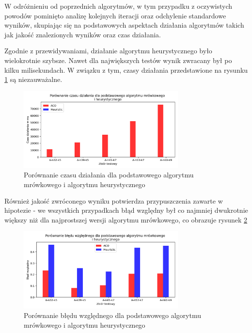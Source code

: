 \documentclass[10pt]{article}
\begin{document}
W odróżnieniu od poprzednich algorytmów, w tym przypadku z oczywistych powodów pominięto analizę kolejnych iteracji oraz odchylenie standardowe wyników, skupiając się na podstawowych aspektach działania algorytmów takich jak jakość znalezionych wyników oraz czas działania.

Zgodnie z przewidywaniami, działanie algorytmu heurystycznego było wielokrotnie szybsze. Nawet dla największych testów wynik zwracany był po kilku milisekundach. W związku z tym, czasy działania przedstawione na rysunku \ref{fig:time_heuristic} są niezauważalne.

\begin{figure}[H]
    \centering
    \includegraphics[width=0.75\textwidth]{time_heuristic.png}
    \caption{Porównanie czasu działania dla podstawowego algorytmu mrówkowego i algorytmu heurystycznego}
    \label{fig:time_heuristic}
\end{figure}

Również jakość zwróconego wyniku potwierdza przypuszczenia zawarte w hipotezie - we wszystkich przypadkach błąd względny był co najmniej dwukrotnie większy niż dla najprostszej wersji algorytmu mrówkowego, co obrazuje rysunek \ref{fig:errors_heuristic}

\begin{figure}[H]
    \centering
    \includegraphics[width=0.75\textwidth]{errors_heuristic.png}
    \caption{Porównanie błędu względnego dla podstawowego algorytmu mrówkowego i algorytmu heurystycznego}
    \label{fig:errors_heuristic}
\end{figure}
\end{document}
